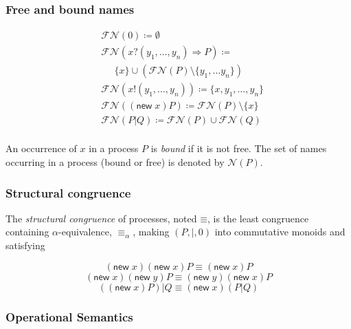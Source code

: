 \documentclass[]{acm_proc_article-sp}
\newcommand{\id}[1]{\texttt{#1}}
\newcommand{\pzero}{\mathbin{0}}
\newcommand{\juxtap}{\mathbin{\id{|}}}
\newcommand{\scong}{\mathbin{\equiv}}
\newcommand{\alphaeq}{\mathbin{\equiv_{\alpha}}}
\newcommand{\names}[1]{\mathbin{\mathcal{N}(#1)}}
\newcommand{\freenames}[1]{\mathbin{\mathcal{FN}(#1)}}
\newcommand{\defneqls}{\coloneqq}
\numberwithin{equation}{subsection}
\begin{document}
\subsubsection{Free and bound names}

\begin{equation*}
  \begin{aligned}
    & \freenames{\pzero} \defneqls \emptyset \\
    & \freenames{{x}{?}{( y_1, \ldots, y_n )} \Rightarrow {P}} \defneqls \\
    & \;\;\;\;\;\{ x \} \cup (\freenames{P} \setminus \{ y_1, \ldots y_n \}) \\
    & \freenames{{x}{!}{( y_1, \ldots, y_n )}} \defneqls \{ x, y_1, \ldots, y_n \} \\
    & \freenames{(\mathsf{new}\; x){P}} \defneqls \freenames{P} \setminus \{x\} \\    
    & \freenames{{P} \juxtap {Q}} \defneqls \freenames{P} \cup \freenames{Q} \\
  \end{aligned}
\end{equation*}

An occurrence of $x$ in a process $P$ is \textit{bound} if it is not
free. The set of names occurring in a process (bound or free) is
denoted by $\names{P}$.

\subsubsection{Structural congruence}

The {\em structural congruence} of processes, noted $\scong$, is the
least congruence containing $\alpha$-equivalence, $\alphaeq$, making
$( P, |, 0 )$ into commutative monoids and satisfying

\begin{equation*}  
  (\mathsf{new}\; x)(\mathsf{new}\; x){P} \scong (\mathsf{new}\; x)P
\end{equation*}
\begin{equation*}  
  (\mathsf{new}\; x)(\mathsf{new}\; y){P} \scong (\mathsf{new}\; y)(\mathsf{new}\; x)P
\end{equation*}
\begin{equation*}  
  ((\mathsf{new}\; x){P}) \juxtap {Q} \scong (\mathsf{new}\; x)({P} \juxtap {Q})
\end{equation*}

\subsubsection{Operational Semantics}\label{section:opsem}
 
\end{document}
